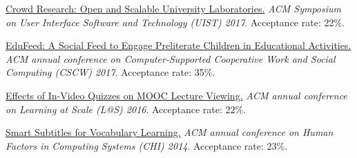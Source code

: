 \href{https://hci.stanford.edu/publications/2017/crowdresearch/crowd-research-uist2017.pdf}{Crowd Research: Open and Scalable University Laboratories.} \emph{ACM Symposium on User Interface Software and Technology (UIST) 2017}. Acceptance rate: 22\%.

\href{https://www.microsoft.com/en-us/research/wp-content/uploads/2016/10/edufeed.pdf}{EduFeed: A Social Feed to Engage Preliterate Children in Educational Activities.} \emph{ACM annual conference on Computer-Supported Cooperative Work and Social Computing (CSCW) 2017}. Acceptance rate: 35\%.

\href{https://hci.stanford.edu/publications/2016/invideo/invideo-las2016.pdf}{Effects of In-Video Quizzes on MOOC Lecture Viewing.} \emph{ACM annual conference on Learning at Scale (L@S) 2016}. Acceptance rate: 22\%.

\href{http://up.csail.mit.edu/other-pubs/chi2014-smartsubs.pdf}{Smart Subtitles for Vocabulary Learning.} \emph{ACM annual conference on Human Factors in Computing Systems (CHI) 2014}. Acceptance rate: 23\%.





